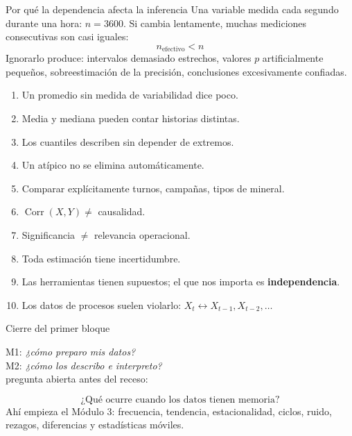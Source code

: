 \begin{frame}{Por qué la dependencia afecta la inferencia}
Una variable medida cada segundo durante una hora: $n=3600$.
Si cambia lentamente, muchas mediciones consecutivas son casi iguales:
\[
n_{\text{efectivo}}<n
\]
Ignorarlo produce: intervalos demasiado estrechos, valores $p$ artificialmente pequeños,
sobreestimación de la precisión, conclusiones excesivamente confiadas.
\end{frame}

\begin{frame}
\begin{recordar}
\begin{enumerate}
  \item Un promedio sin medida de variabilidad dice poco.
  \item Media y mediana pueden contar historias distintas.
  \item Los cuantiles describen sin depender de extremos.
  \item Un atípico no se elimina automáticamente.
  \item Comparar explícitamente turnos, campañas, tipos de mineral.
  \item $\operatorname{Corr}(X,Y)\neq$ causalidad.
  \item Significancia $\neq$ relevancia operacional.
  \item Toda estimación tiene incertidumbre.
  \item Las herramientas tienen supuestos; el que nos importa es \textbf{independencia}.
  \item Los datos de procesos suelen violarlo: $X_t\leftrightarrow X_{t-1},X_{t-2},\dots$
\end{enumerate}
\end{recordar}
\end{frame}

\begin{frame}{Cierre del primer bloque}
\begin{center}
M1: \emph{¿cómo preparo mis datos?}\\[0.3em]
M2: \emph{¿cómo los describo e interpreto?}\\[0.6em]
\fl\quad pregunta abierta antes del receso:
\end{center}
\vfill
\[
\boxed{\text{¿Qué ocurre cuando los datos tienen memoria?}}
\]
Ahí empieza el Módulo 3: frecuencia, tendencia, estacionalidad, ciclos, ruido,
rezagos, diferencias y estadísticas móviles.
\end{frame}



